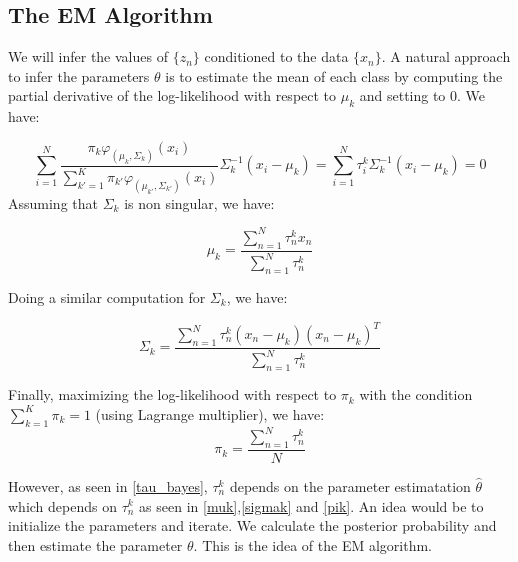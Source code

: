\documentclass[12pt]{article}
\def\hat{\widehat}
\begin{document}

\subsection{The EM Algorithm}

We will infer the values of $\{z_n\}$ conditioned to the data $\{x_n\}$. A natural approach to infer the parameters $\theta$ is to estimate the mean of each class by computing the partial derivative of the log-likelihood with respect to $\mu_k$ and setting to 0. We have:


\begin{equation}
\sum_{i=1}^N\frac{\pi_k\varphi_{(\mu_k,\Sigma_k)}(x_i)}{\sum_{k'=1}^K\pi_{k'}\varphi_{(\mu_{k'},\Sigma_{k'})}(x_i)} \Sigma_k^{-1}(x_i-\mu_k)=\sum_{i=1}^N \tau_i^k \Sigma_k^{-1}(x_i-\mu_k)=0
\end{equation}
Assuming that $\Sigma_k$ is non singular, we have:

\begin{equation}
\label{muk}
\mu_k=\frac{\sum_{n=1}^N\tau_n^k x_n}{\sum_{n=1}^N\tau_n^k}
\end{equation}

Doing a similar computation for $\Sigma_k$, we have:

\begin{equation}
\label{sigmak}
\Sigma_k=\frac{\sum_{n=1}^N \tau_n^k (x_n-\mu_k)(x_n-\mu_k)^T}{\sum_{n=1}^N\tau_n^k}
\end{equation}

Finally, maximizing the log-likelihood with respect to $\pi_k$ with the condition $\sum_{k=1}^K\pi_k=1$ (using Lagrange multiplier), we have:
\begin{equation}
\label{pik}
\pi_k=\frac{\sum_{n=1}^N\tau_n^k}{N}
\end{equation}

However, as seen in \eqref{tau_bayes}, $\tau_n^k$ depends on the parameter estimatation $\hat\theta$ which depends on $\tau_n^k$ as seen in \eqref{muk},\eqref{sigmak} and \eqref{pik}. An idea would be to initialize the parameters and iterate. We calculate the posterior probability and then estimate the parameter $\theta$. This is the idea of the EM algorithm.
\\
\end{document}
